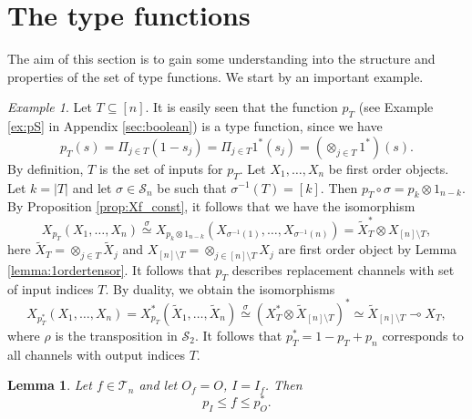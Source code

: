 \documentclass[12pt]{article}
\newtheorem{lemma}{Lemma}
\theoremstyle{definition}
\theoremstyle{remark}
\newtheorem{exm}{Example}
\def\Te{\mathcal T}
\def\permut{\mathscr{S}}
\begin{document}
\section{The type functions}

The aim of this section is to gain some understanding into the structure and properties of
the set of type functions. We start by an important example.


\begin{exm}\label{exm:type_channels}
Let $T\subseteq [n]$. It is easily seen that the function  $p_T$ (see Example \ref{ex:pS}
in Appendix \ref{sec:boolean}) is a type function, since we have
\[
p_T(s)=\Pi_{j\in T}(1-s_j)=\Pi_{j\in T} 1^*(s_j)=(\otimes_{j\in T}1^*)(s).
\]
By definition, $T$ is the set of inputs for $p_T$. Let $X_1,\dots, X_n$ be 
 first order objects. Let $k=|T|$ and let $\sigma\in \permut_n$ be such that
$\sigma^{-1}(T)=[k]$. Then 
$p_T\circ \sigma=p_{k}\otimes 1_{n-k}$. By Proposition \ref{prop:Xf_const}, it follows that
we have the {\color{red} isomorphism}  
\[
X_{p_T}(X_1,\dots,X_n)\overset{\sigma}{\simeq}X_{p_{k}\otimes 1_{n-k}}(X_{\sigma^{-1}(1)},\dots, X_{\sigma^{-1}(n)})=\tilde
X_T^*\otimes X_{[n]\setminus T},
\]
here $\tilde X_T=\otimes_{j\in T} \tilde X_j$ and $X_{[n]\setminus T}=\otimes_{j\in
[n]\setminus T} X_j$ are first order object by Lemma \ref{lemma:1ordertensor}.
It follows that $p_T$ describes replacement channels with set of input indices  $T$. By duality,
we obtain the isomorphisms
\[
X_{p_T^*}(X_1,\dots,X_n)=X_{p_T}^*(\tilde X_1,\dots,\tilde X_n)\overset{\sigma}{\simeq} (X_T^*\otimes \tilde
X_{[n]\setminus T})^*\simeq  \tilde X_{[n]\setminus T}\multimap X_T,
\]
where $\rho$ is the transposition in $\permut_2$. It follows
that $p^*_T=1-p_T+p_{n}$ corresponds to all channels with output indices $T$.

\end{exm}


\begin{lemma}\label{lemma:fh_setting} Let $f\in\Te_n$ and let $O_f=O$,  $I=I_f$. Then
\[
p_I\le f\le p_O^*.
\]

\end{lemma}
\end{document}
